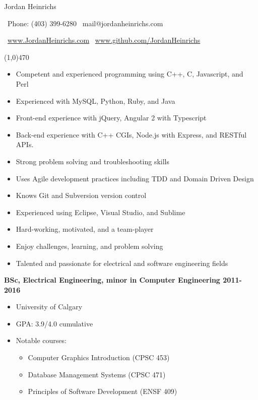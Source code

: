 \documentclass[12pt]{article}
\begin{document}
\centerline{{\Huge \sc Jordan Heinrichs}}
\medskip
\centerline{\textbullet\ Phone: (403) 399-6280 \hspace{5pt} \textbullet\ mail@jordanheinrichs.com}
\centerline{\textbullet\ \url{www.JordanHeinrichs.com}  \hspace{5pt} \textbullet\ \url{www.github.com/JordanHeinrichs}}
\noindent
\line(1,0){470}\\

\bigskip
{}
\medskip

\begin{itemize}
\item Competent and experienced programming using C++, C, Javascript, and Perl
\item Experienced with MySQL, Python, Ruby, and Java
\item Front-end experience with jQuery, Angular 2 with Typescript
\item Back-end experience with C++ CGIs, Node.js with Express, and RESTful APIs.  
\item Strong problem solving and troubleshooting skills
\item Uses Agile development practices including TDD and Domain Driven Design
\item Knows Git and Subversion version control
\item Experienced using Eclipse, Visual Studio, and Sublime
\item Hard-working, motivated, and a team-player
\item Enjoy challenges, learning, and problem solving
\item Talented and passionate for electrical and software engineering fields
\end{itemize}
\noindent

\bigskip
{}
\medskip

\noindent \centerline{ \bf BSc, Electrical Engineering, minor in Computer Engineering  \hfill 2011-2016}
\begin{itemize}[parsep=0pt,partopsep=0pt]
  \item University of Calgary
  \item GPA: 3.9/4.0 cumulative
  \item Notable courses:
  \begin{itemize}
    \item Computer Graphics Introduction (CPSC 453)
    \item Database Management Systems (CPSC 471)
    \item Principles of Software Development (ENSF 409)
  \end{itemize}
\end{itemize}
\end{document}
